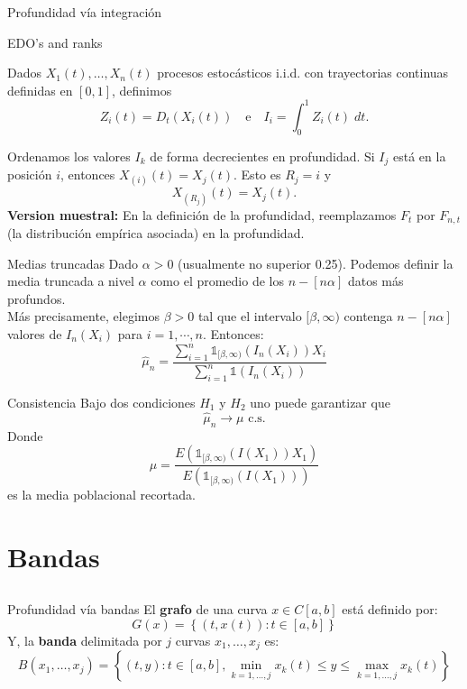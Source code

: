 \documentclass[10pt]{beamer}
\begin{document}
{{\begin{frame}{Profundidad vía integración}
\end{frame}

\begin{frame}{EDO's and ranks}

    Dados $X_1(t),\ldots,X_n(t)$ procesos estocásticos i.i.d. con trayectorias continuas definidas en $[0,1]$, definimos 
    $$Z_i(t)=D_t(X_i(t))\quad\text{e}\quad I_i=\int_{0}^{1}Z_i(t)\;dt.$$
    
    Ordenamos los valores $I_k$ de forma decrecientes en profundidad. Si $I_j$ está en la posición $i$, entonces $X_{(i)}(t)=X_{j}(t)$. Esto es $R_j=i$ y $$X_{(R_j)}(t)=X_j(t).$$
    \textbf{Version muestral:} En la definición de la profundidad, reemplazamos $F_t$ por $F_{n,t}$ (la distribución empírica asociada) en la profundidad.
\end{frame}

\begin{frame}{Medias truncadas}
    Dado $\alpha>0$ (usualmente no superior 0.25). Podemos definir la media truncada a nivel $\alpha$ como el promedio de los $n-[n\alpha]$ datos más profundos.
    \\[1cm]
    Más precisamente, elegimos $\beta>0$ tal que el intervalo $[\beta, \infty)$ contenga $n-[n\alpha]$ valores de $I_n(X_i)$ para $i=1,\cdots, n$. Entonces:
    $$\widehat{\mu}_{n}=\frac{\sum_{i=1}^n\mathds{1}_{[\beta,\infty)}(I_n(X_i))X_i}{\sum_{i=1}^{n}\mathds{1}(I_n(X_i))}$$
\end{frame}

\begin{frame}{Consistencia}
    Bajo dos condiciones $H_1$ y $H_2$ uno puede garantizar que 
    $$\widehat{\mu}_n\to\mu\text{ c.s.}$$
    Donde 
    $$\mu=\frac{E(\mathds{1}_{[\beta,\infty)}(I(X_1))X_1)}{E(\mathds{1}_{[\beta,\infty)}(I(X_1)))}$$
    es la media poblacional recortada. 
\end{frame}

\section[Profundidad vía bandas]{Bandas}
\subsection{}

\begin{frame}{Profundidad vía bandas}
    El \textbf{grafo} de una curva $x\in C[a,b]$ está definido por:
    $$G(x)=\left\{(t,x(t)):t\in [a,b]\right\}$$
    Y, la \textbf{banda} delimitada por $j$ curvas $x_1,\ldots, x_j$ es:
    $$B(x_1,\ldots,x_j)=\left\{(t,y):t\in[a,b],\min_{k=1,\ldots,j}x_k(t)\leq y\leq \max_{k=1,\ldots,j}x_k(t) \right\}$$
\end{frame}

}}
\end{document}
